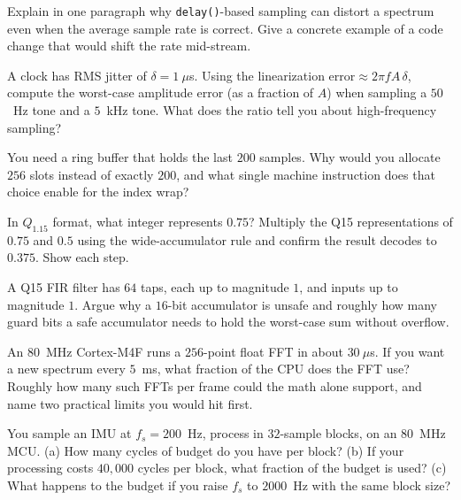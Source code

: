 \begin{exercise}
Explain in one paragraph why \texttt{delay()}-based sampling can distort a spectrum even when the
average sample rate is correct. Give a concrete example of a code change that would shift the rate
mid-stream.
\end{exercise}

\begin{exercise}
A clock has RMS jitter of $\delta = 1~\mu$s. Using the linearization
$\text{error}\approx 2\pi f A\,\delta$, compute the worst-case amplitude error (as a fraction of
$A$) when sampling a $50$~Hz tone and a $5$~kHz tone. What does the ratio tell you about
high-frequency sampling?
\end{exercise}

\begin{exercise}
You need a ring buffer that holds the last $200$ samples. Why would you allocate $256$ slots
instead of exactly $200$, and what single machine instruction does that choice enable for the
index wrap?
\end{exercise}

\begin{exercise}
In $Q_{1.15}$ format, what integer represents $0.75$? Multiply the Q15 representations of $0.75$
and $0.5$ using the wide-accumulator rule and confirm the result decodes to $0.375$. Show each
step.
\end{exercise}

\begin{exercise}
A Q15 FIR filter has $64$ taps, each up to magnitude $1$, and inputs up to magnitude $1$. Argue why
a $16$-bit accumulator is unsafe and roughly how many guard bits a safe accumulator needs to hold
the worst-case sum without overflow.
\end{exercise}

\begin{exercise}
An $80$~MHz Cortex-M4F runs a $256$-point float FFT in about $30~\mu$s. If you want a new spectrum
every $5$~ms, what fraction of the CPU does the FFT use? Roughly how many such FFTs per frame could
the math alone support, and name two practical limits you would hit first.
\end{exercise}

\begin{exercise}
You sample an IMU at $f_s=200$~Hz, process in $32$-sample blocks, on an $80$~MHz MCU. (a) How many
cycles of budget do you have per block? (b) If your processing costs $40{,}000$ cycles per block,
what fraction of the budget is used? (c) What happens to the budget if you raise $f_s$ to
$2000$~Hz with the same block size?
\end{exercise}

